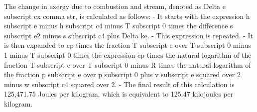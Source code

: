 The change in exergy due to combustion and stream, denoted as Delta e subscript cx comma str, is calculated as follows:
- It starts with the expression h subscript e minus h subscript c4 minus T subscript 0 times the difference s subscript e2 minus s subscript c4 plus Delta ke.
- This expression is repeated.
- It is then expanded to cp times the fraction T subscript e over T subscript 0 minus 1 minus T subscript 0 times the expression cp times the natural logarithm of the fraction T subscript e over T subscript 0 minus R times the natural logarithm of the fraction p subscript e over p subscript 0 plus v subscript e squared over 2 minus w subscript c4 squared over 2.
- The final result of this calculation is 125,471.75 Joules per kilogram, which is equivalent to 125.47 kilojoules per kilogram.